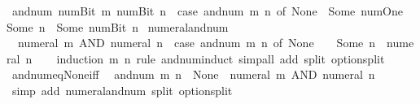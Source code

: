 \begin{isabellebody}
{\isacharbar}{\kern0pt}\ {\isacartoucheopen}and{\isacharunderscore}{\kern0pt}num\ {\isacharparenleft}{\kern0pt}num{\isachardot}{\kern0pt}Bit{}\ m{\isacharparenright}{\kern0pt}\ {\isacharparenleft}{\kern0pt}num{\isachardot}{\kern0pt}Bit{}\ n{\isacharparenright}{\kern0pt}\ {\isacharequal}{\kern0pt}\ {\isacharparenleft}{\kern0pt}case\ and{\isacharunderscore}{\kern0pt}num\ m\ n\ of\ None\ {\isasymRightarrow}\ Some\ num{\isachardot}{\kern0pt}One\ {\isacharbar}{\kern0pt}\ Some\ n{\isacharprime}{\kern0pt}\ {\isasymRightarrow}\ Some\ {\isacharparenleft}{\kern0pt}num{\isachardot}{\kern0pt}Bit{}\ n{\isacharprime}{\kern0pt}{\isacharparenright}{\kern0pt}{\isacharparenright}{\kern0pt}{\isacartoucheclose}\isanewline
\isanewline
{}\isamarkupfalse%
\ numeral{\isacharunderscore}{\kern0pt}and{\isacharunderscore}{\kern0pt}num{\isacharcolon}{\kern0pt}\isanewline
\ \ {\isacartoucheopen}numeral\ m\ AND\ numeral\ n\ {\isacharequal}{\kern0pt}\ {\isacharparenleft}{\kern0pt}case\ and{\isacharunderscore}{\kern0pt}num\ m\ n\ of\ None\ {\isasymRightarrow}\ {}\ {\isacharbar}{\kern0pt}\ Some\ n{\isacharprime}{\kern0pt}\ {\isasymRightarrow}\ numeral\ n{\isacharprime}{\kern0pt}{\isacharparenright}{\kern0pt}{\isacartoucheclose}\isanewline
%
\isadelimproof
\ \ %
\endisadelimproof
%
\isatagproof
{}\isamarkupfalse%
\ {\isacharparenleft}{\kern0pt}induction\ m\ n\ rule{\isacharcolon}{\kern0pt}\ and{\isacharunderscore}{\kern0pt}num{\isachardot}{\kern0pt}induct{\isacharparenright}{\kern0pt}\ {\isacharparenleft}{\kern0pt}simp{\isacharunderscore}{\kern0pt}all\ add{\isacharcolon}{\kern0pt}\ split{\isacharcolon}{\kern0pt}\ option{\isachardot}{\kern0pt}split{\isacharparenright}{\kern0pt}%
\endisatagproof
{\isafoldproof}%
%
\isadelimproof
\isanewline
%
\endisadelimproof
\isanewline
{}\isamarkupfalse%
\ and{\isacharunderscore}{\kern0pt}num{\isacharunderscore}{\kern0pt}eq{\isacharunderscore}{\kern0pt}None{\isacharunderscore}{\kern0pt}iff{\isacharcolon}{\kern0pt}\isanewline
\ \ {\isacartoucheopen}and{\isacharunderscore}{\kern0pt}num\ m\ n\ {\isacharequal}{\kern0pt}\ None\ {\isasymlongleftrightarrow}\ numeral\ m\ AND\ numeral\ n\ {\isacharequal}{\kern0pt}\ {}{\isacartoucheclose}\isanewline
%
\isadelimproof
\ \ %
\endisadelimproof
%
\isatagproof
{}\isamarkupfalse%
\ {\isacharparenleft}{\kern0pt}simp\ add{\isacharcolon}{\kern0pt}\ numeral{\isacharunderscore}{\kern0pt}and{\isacharunderscore}{\kern0pt}num\ split{\isacharcolon}{\kern0pt}\ option{\isachardot}{\kern0pt}split{\isacharparenright}{\kern0pt}%

\end{isabellebody}

